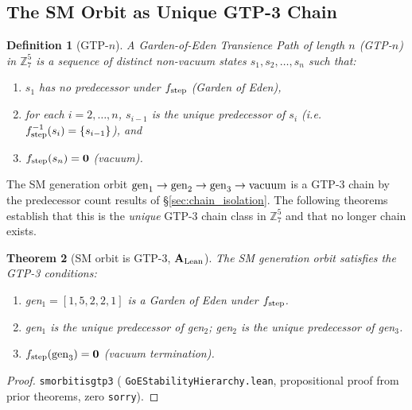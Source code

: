 \documentclass[11pt]{article}
\newtheorem{theorem}{Theorem}[section]
\newtheorem{definition}[theorem]{Definition}
\theoremstyle{remark}
\newcommand{\lean}[1]{%
  \penalty-100
  \begingroup\def\_{\textunderscore\allowbreak}\texttt{#1}\endgroup}
\newcommand{\CatAL}{\ensuremath{\textbf{A}_{\rm Lean}}}
\begin{document}
\subsection{The SM Orbit as Unique GTP-3 Chain}
\label{sec:gtp3}

\begin{definition}[GTP-$n$]\label{def:gtp}
A \emph{Garden-of-Eden Transience Path of length $n$} (GTP-$n$) in $\mathbb{Z}_7^5$
is a sequence of distinct non-vacuum states $s_1, s_2, \ldots, s_n$ such that:
\begin{enumerate}[nosep,label=(\roman*)]
\item $s_1$ has no predecessor under $f_{\rm step}$ (Garden of Eden),
\item for each $i = 2, \ldots, n$, $s_{i-1}$ is the \emph{unique} predecessor of $s_i$
      (i.e.\ $f_{\rm step}^{-1}(s_i) = \{s_{i-1}\}$), and
\item $f_{\rm step}(s_n) = \mathbf{0}$ (vacuum).
\end{enumerate}
\end{definition}

The SM generation orbit ${\rm gen}_1 \to {\rm gen}_2 \to {\rm gen}_3 \to {\rm vacuum}$
is a GTP-3 chain by the predecessor count results of \S\ref{sec:chain_isolation}.
The following theorems establish that this is the \emph{unique} GTP-3 chain class
in $\mathbb{Z}_7^5$ and that no longer chain exists.

\begin{theorem}[SM orbit is GTP-3, $\CatAL$]\label{thm:sm_is_gtp3}
The SM generation orbit satisfies the GTP-3 conditions:
\begin{enumerate}[nosep,label=(\roman*)]
\item gen$_1 = [1,5,2,2,1]$ is a Garden of Eden under $f_{\rm step}$.
\item gen$_1$ is the unique predecessor of gen$_2$;
      gen$_2$ is the unique predecessor of gen$_3$.
\item $f_{\rm step}({\rm gen}_3) = \mathbf{0}$ (vacuum termination).
\end{enumerate}
\end{theorem}

\begin{proof}
\lean{sm\_orbit\_is\_gtp3} (\lean{GoEStabilityHierarchy.lean},
propositional proof from prior theorems, zero \texttt{sorry}).
\end{proof}
\end{document}
